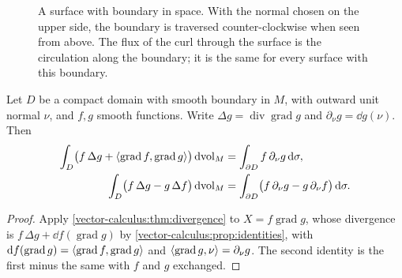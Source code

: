 \begin{notechapter}
\begin{figure}[ht]
\centering
{}
\caption{A surface with boundary in space. With the normal chosen on
the upper side, the boundary is traversed counter-clockwise when seen
from above. The flux of the curl through the surface is the
circulation along the boundary; it is the same for every surface with
this boundary.}
\label{vector-calculus:fig:kelvin}
\end{figure}

\begin{corollary}\label{vector-calculus:cor:green}
Let $D$ be a compact domain with smooth boundary in $M$, with outward
unit normal $\nu$, and $f, g$ smooth functions. Write
$\Delta g = \operatorname{div}\operatorname{grad}g$ and
$\partial_\nu g = \dd g(\nu)$. Then
\begin{align*}
  \int_D\bigl(f\,\Delta g + \left\langle \operatorname{grad}f, \operatorname{grad}g \right\rangle\bigr)\,\mathrm{d}\!\operatorname{vol}_M
  &= \int_{\partial D}f\,\partial_\nu g\,\mathrm{d}\sigma , \\
  \int_D\bigl(f\,\Delta g - g\,\Delta f\bigr)\,
    \mathrm{d}\!\operatorname{vol}_M
  &= \int_{\partial D}\bigl(f\,\partial_\nu g - g\,\partial_\nu f\bigr)
    \,\mathrm{d}\sigma .
\end{align*}
\end{corollary}

\begin{proof}
Apply \cref{vector-calculus:thm:divergence} to
$X = f\operatorname{grad}g$, whose divergence is
$f\,\Delta g + \dd f(\operatorname{grad}g)$ by
\cref{vector-calculus:prop:identities}, with
$\mathrm{d} f(\operatorname{grad}g)
= \left\langle \operatorname{grad}f, \operatorname{grad}g \right\rangle$ and
$\left\langle \operatorname{grad}g, \nu \right\rangle = \partial_\nu g$. The second
identity is the first minus the same with $f$ and $g$ exchanged.
\end{proof}


\end{notechapter}
